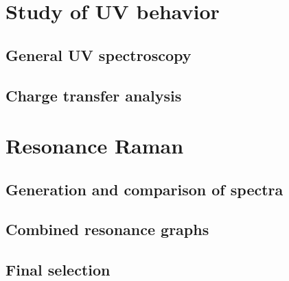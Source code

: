 \section{Study of UV behavior}
\blindtext
\subsection{General UV spectroscopy}
\blindtext
\subsection{Charge transfer analysis}
\blindtext

\section{Resonance Raman}
\blindtext
\subsection{Generation and comparison of spectra}
\blindtext
\subsection{Combined resonance graphs}
\blindtext
\subsection{Final selection}
\blindtext
